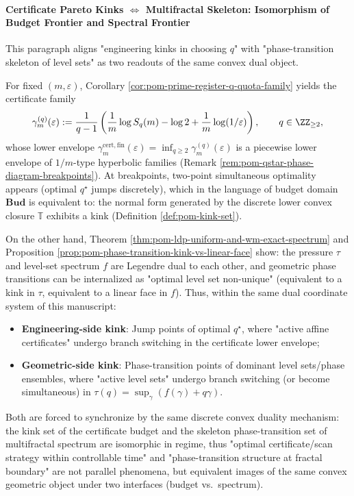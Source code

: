 
\paragraph{Certificate Pareto Kinks \texorpdfstring{$\Longleftrightarrow$}{<->} Multifractal Skeleton: Isomorphism of Budget Frontier and Spectral Frontier}
This paragraph aligns "engineering kinks in choosing \(q\)" with "phase-transition skeleton of level sets" as two readouts of the same convex dual object.

\begin{remark}\label{rem:pom-certificate-pareto-kink-multifractal-skeleton}
For fixed \((m,\varepsilon)\), Corollary \ref{cor:pom-prime-register-q-quota-family} yields the certificate family
\[
\gamma^{(q)}_{m}(\varepsilon)
:=\frac{1}{q-1}\left(\frac{1}{m}\log S_q(m)-\log 2+\frac{1}{m}\log(1/\varepsilon)\right),
\qquad q\in\ZZ_{\ge 2},
\]
whose lower envelope
\(
\gamma^{\mathrm{cert,fin}}_m(\varepsilon)=\inf_{q\ge 2}\gamma^{(q)}_m(\varepsilon)
\)
is a piecewise lower envelope of \(1/m\)-type hyperbolic families (Remark \ref{rem:pom-qstar-phase-diagram-breakpoints}).
At breakpoints, two-point simultaneous optimality appears (optimal \(q^\star\) jumps discretely), which in the language of budget domain \(\mathbf{Bud}\) is equivalent to: the normal form generated by the discrete lower convex closure \(\mathbb{T}\) exhibits a kink (Definition \ref{def:pom-kink-set}).
\par
On the other hand, Theorem \ref{thm:pom-ldp-uniform-and-wm-exact-spectrum} and Proposition \ref{prop:pom-phase-transition-kink-vs-linear-face} show: the pressure \(\tau\) and level-set spectrum \(f\) are Legendre dual to each other,
and geometric phase transitions can be internalized as "optimal level set non-unique" (equivalent to a kink in \(\tau\), equivalent to a linear face in \(f\)).
Thus, within the same dual coordinate system of this manuscript:
\begin{itemize}
  \item \textbf{Engineering-side kink}: Jump points of optimal \(q^\star\), where "active affine certificates" undergo branch switching in the certificate lower envelope;
  \item \textbf{Geometric-side kink}: Phase-transition points of dominant level sets/phase ensembles, where "active level sets" undergo branch switching (or become simultaneous) in \(\tau(q)=\sup_\gamma(f(\gamma)+q\gamma)\).
\end{itemize}
Both are forced to synchronize by the same discrete convex duality mechanism: the kink set of the certificate budget and the skeleton phase-transition set of multifractal spectrum are isomorphic in regime,
thus "optimal certificate/scan strategy within controllable time" and "phase-transition structure at fractal boundary" are not parallel phenomena, but equivalent images of the same convex geometric object under two interfaces (budget vs.\ spectrum).
\end{remark}


